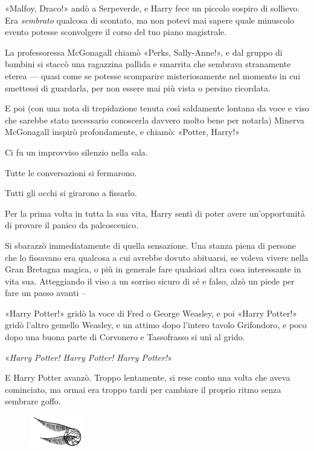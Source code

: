 «Malfoy, Draco!» andò a Serpeverde, e Harry fece un piccolo sospiro di sollievo. Era \textit{sembrato} qualcosa di scontato, ma non potevi mai sapere quale minuscolo evento potesse sconvolgere il corso del tuo piano magistrale.

La professoressa McGonagall chiamò «Perks, Sally-Anne!», e dal gruppo di bambini si staccò una ragazzina pallida e smarrita che sembrava stranamente eterea — quasi come se potesse scomparire misteriosamente nel momento in cui smettessi di guardarla, per non essere mai più vista o persino ricordata.

E poi (con una nota di trepidazione tenuta così saldamente lontana da voce e viso che sarebbe stato necessario conoscerla davvero molto bene per notarla) Minerva McGonagall inspirò profondamente, e chiamò: «Potter, Harry!»

Ci fu un improvviso silenzio nella sala.

Tutte le conversazioni si fermarono.

Tutti gli occhi si girarono a fissarlo.

Per la prima volta in tutta la sua vita, Harry sentì di poter avere un’opportunità di provare il panico da palcoscenico.

Si sbarazzò immediatamente di quella sensazione. Una stanza piena di persone che lo fissavano era qualcosa a cui avrebbe dovuto abituarsi, se voleva vivere nella Gran Bretagna magica, o più in generale fare qualsiasi altra cosa interessante in vita sua. Atteggiando il viso a un sorriso sicuro di sé e falso, alzò un piede per fare un passo avanti –

«Harry Potter!» gridò la voce di Fred o George Weasley, e poi «Harry Potter!» gridò l’altro gemello Weasley, e un attimo dopo l’intero tavolo Grifondoro, e poco dopo una buona parte di Corvonero e Tassofrasso si unì al grido.

«\textit{Harry Potter! Harry Potter! Harry Potter!}»

E Harry Potter avanzò. Troppo lentamente, si rese conto una volta che aveva cominciato, ma ormai era troppo tardi per cambiare il proprio ritmo senza sembrare goffo.

\begin{figure}[h!]
        \includegraphics[scale=0.4]{boccino.png}
        \centering
\end{figure}

